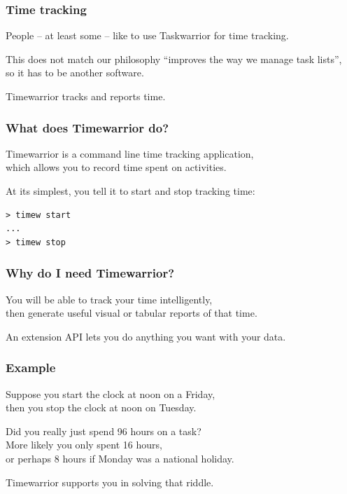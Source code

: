 \documentclass[t,handout,aspectratio=169]{beamer}
\begin{document}
\begin{frame}[fragile]\frametitle{Time tracking}
    \vfill
    People -- at least some -- like to use Taskwarrior for time tracking. \pause

    This does not match our philosophy ``improves the way we manage task lists'', \\
    so it has to be another software.
\end{frame}

\begin{frame}[standout]
    Timewarrior tracks and reports time.
\end{frame}

\begin{frame}[fragile]\frametitle{What does Timewarrior do?}
    \vfill
    Timewarrior is a command line time tracking application, \\
    which allows you to record time spent on activities. \pause

    At its simplest, you tell it to start and stop tracking time:

    \begin{lstlisting}
> timew start
...
> timew stop\end{lstlisting}
\end{frame}

\begin{frame}[fragile]\frametitle{Why do I need Timewarrior?}
    \vfill
    You will be able to track your time intelligently, \\
    then generate useful visual or tabular reports of that time. \pause

    An extension API lets you do anything you want with your data.
\end{frame}

\begin{frame}[fragile]\frametitle{Example}
    \vfill
    Suppose you start the clock at noon on a Friday, \\
    then you stop the clock at noon on Tuesday. \pause

    Did you really just spend 96 hours on a task? \\ \pause
    More likely you only spent 16 hours, \\ \pause
    or perhaps 8 hours if Monday was a national holiday. \pause

    Timewarrior supports you in solving that riddle.
\end{frame}
\end{document}
